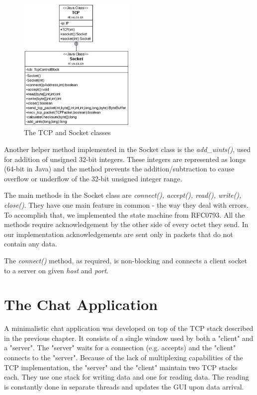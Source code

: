 \documentclass{article}
\begin{document}
\begin{figure}[h!]
 \centering
 \includegraphics[width=0.5\textwidth]{images/tcp_socket}
 \caption{The TCP and Socket classes}
  \label{fig:socket}
\end{figure}

Another helper method implemented in the Socket class is the \textit{add\_uints()}, used for addition of unsigned 32-bit
integers. These integers are represented as longs (64-bit in Java) and the method prevents the addition/subtraction to
cause overflow or underflow of the 32-bit unsigned integer range.

The main methods in the Socket class are \textit{connect(), accept(), read(), write(), close()}. They have one main feature
in common - the way they deal with errors. To accomplish that, we implemented the state machine from RFC0793. All the methods
require acknowledgement by the other side of every octet they send. In our implementation acknowledgements are sent only in
packets that do not contain any data.



The \textit{connect()} method, as required, is non-blocking and connects a client socket to a server on given \textit{host}
and \textit{port}.



\section{The Chat Application}
A minimalistic chat application was developed on top of the TCP stack described in the previous chapter.
It consists of a single window used by both a "client" and a "server". The "server" waits for a connection
(e.g. accepts) and the "client" connects to the "server". Because of the lack of multiplexing capabilities
of the TCP implementation, the "server" and the "client" maintain two TCP stacks each. They use one stack
for writing data and one for reading data. The reading is constantly done in separate threads and updates
the GUI upon data arrival.
\end{document}

